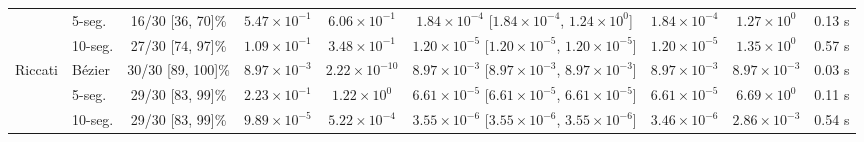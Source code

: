 \begin{tabular}{llccccccc}
 & 5-seg. & 16/30 [36, 70]\% & $5.47\times10^{-1}$ & $6.06\times10^{-1}$ & $1.84\times10^{-4}$ [$1.84\times10^{-4}$, $1.24\times10^{0}$] & $1.84\times10^{-4}$ & $1.27\times10^{0}$ & 0.13 s\\
 & 10-seg. & 27/30 [74, 97]\% & $1.09\times10^{-1}$ & $3.48\times10^{-1}$ & $1.20\times10^{-5}$ [$1.20\times10^{-5}$, $1.20\times10^{-5}$] & $1.20\times10^{-5}$ & $1.35\times10^{0}$ & 0.57 s\\
\addlinespace
Riccati & B\'ezier & 30/30 [89, 100]\% & $8.97\times10^{-3}$ & $2.22\times10^{-10}$ & $8.97\times10^{-3}$ [$8.97\times10^{-3}$, $8.97\times10^{-3}$] & $8.97\times10^{-3}$ & $8.97\times10^{-3}$ & 0.03 s\\
 & 5-seg. & 29/30 [83, 99]\% & $2.23\times10^{-1}$ & $1.22\times10^{0}$ & $6.61\times10^{-5}$ [$6.61\times10^{-5}$, $6.61\times10^{-5}$] & $6.61\times10^{-5}$ & $6.69\times10^{0}$ & 0.11 s\\
 & 10-seg. & 29/30 [83, 99]\% & $9.89\times10^{-5}$ & $5.22\times10^{-4}$ & $3.55\times10^{-6}$ [$3.55\times10^{-6}$, $3.55\times10^{-6}$] & $3.46\times10^{-6}$ & $2.86\times10^{-3}$ & 0.54 s\\
\bottomrule
\end{tabular}